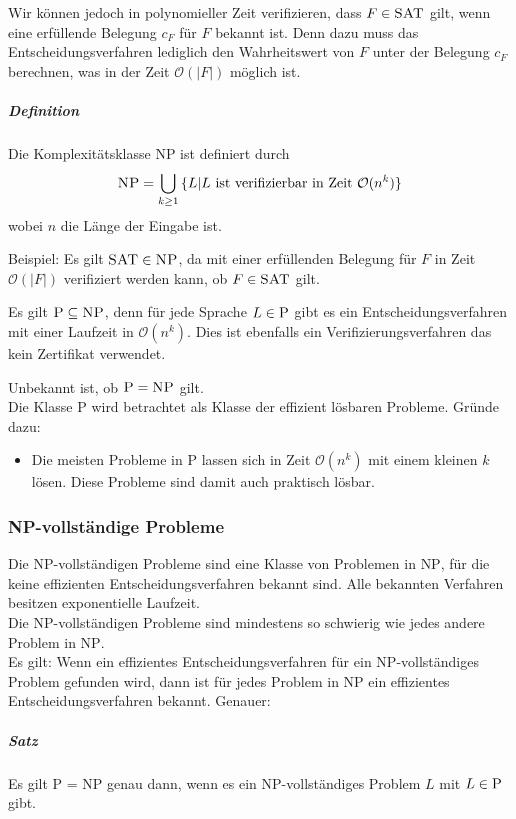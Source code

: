 \documentclass[a4paper]{scrartcl}
\begin{document}
Wir können jedoch in polynomieller Zeit verifizieren, dass $F \in \textsc{SAT}$ gilt, wenn eine erfüllende Belegung $c_F$ für $F$ bekannt ist. Denn dazu muss das Entscheidungsverfahren lediglich den  Wahrheitswert von $F$ unter der Belegung $c_F$ berechnen, was in der Zeit $\mathcal{O} (\lvert F \rvert )$ möglich ist.

\subparagraph{Definition} Die Komplexitätsklasse \textsc{NP} ist definiert durch 
\[ \textsc{NP} = \bigcup\limits_{k \geq 1} \,\{ L | L \text{ ist verifizierbar in Zeit } \mathcal{O} (n^k) \} \]
wobei $n$ die Länge der Eingabe ist.

Beispiel: Es gilt $\textsc{SAT} \in \textsc{NP}$, da mit einer erfüllenden Belegung für $F$ in Zeit $\mathcal{O} ( \lvert F \rvert )$ verifiziert werden kann, ob $F \in \textsc{SAT}$ gilt.

Es gilt $\textsc{P} \subseteq \textsc{NP}$, denn für jede Sprache $L \in \textsc{P}$ gibt es ein Entscheidungsverfahren mit einer Laufzeit in $\mathcal{O} (n^k)$. Dies ist ebenfalls ein Verifizierungsverfahren das kein Zertifikat verwendet.

Unbekannt ist, ob $\textsc{P} = \textsc{NP}$ gilt.\\
Die Klasse \textsc{P} wird betrachtet als Klasse der effizient lösbaren Probleme. Gründe dazu:
\begin{itemize}
\item Die meisten Probleme in \textsc{P} lassen sich in Zeit $\mathcal{O} (n^k)$ mit einem kleinen $k$ lösen. Diese Probleme sind damit auch praktisch lösbar.
\end{itemize}

\subsubsection{NP-vollständige Probleme}
Die \textsc{NP}-vollständigen Probleme sind eine Klasse von Problemen in \textsc{NP}, für die keine effizienten Entscheidungsverfahren bekannt sind. Alle bekannten Verfahren besitzen exponentielle Laufzeit.\\
Die \textsc{NP}-vollständigen Probleme sind mindestens so schwierig wie jedes andere Problem in \textsc{NP}.\\
Es gilt: Wenn ein effizientes Entscheidungsverfahren für ein \textsc{NP}-vollständiges Problem gefunden wird, dann ist für jedes Problem in \textsc{NP} ein effizientes Entscheidungsverfahren bekannt. Genauer:

\subparagraph{Satz} Es gilt \textsc{P = NP} genau dann, wenn es ein \textsc{NP}-vollständiges Problem $L$ mit $L \in \textsc{P}$ gibt.
\end{document}

